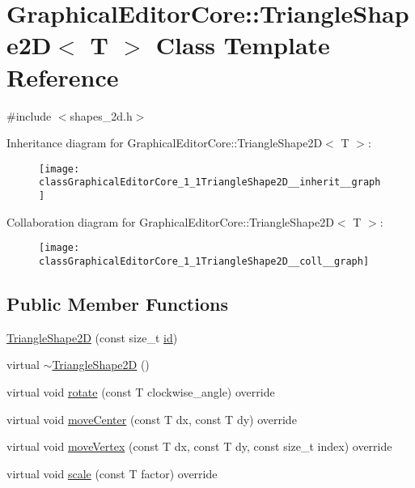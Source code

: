 \hypertarget{classGraphicalEditorCore_1_1TriangleShape2D}{}\section{Graphical\+Editor\+Core\+:\+:Triangle\+Shape2D$<$ T $>$ Class Template Reference}
\label{classGraphicalEditorCore_1_1TriangleShape2D}


{\ttfamily \#include $<$shapes\+\_\+2d.\+h$>$}



Inheritance diagram for Graphical\+Editor\+Core\+:\+:Triangle\+Shape2D$<$ T $>$\+:
\nopagebreak
\begin{figure}[H]
\begin{center}
\leavevmode
\texttt{[image: classGraphicalEditorCore\_1\_1TriangleShape2D\_\_inherit\_\_graph]}
\end{center}
\end{figure}


Collaboration diagram for Graphical\+Editor\+Core\+:\+:Triangle\+Shape2D$<$ T $>$\+:
\nopagebreak
\begin{figure}[H]
\begin{center}
\leavevmode
\texttt{[image: classGraphicalEditorCore\_1\_1TriangleShape2D\_\_coll\_\_graph]}
\end{center}
\end{figure}
\subsection*{Public Member Functions}
\begin{DoxyCompactItemize}
\item 
\hyperlink{classGraphicalEditorCore_1_1TriangleShape2D_af0339a667c63abd464603bf68e8d4770}{Triangle\+Shape2D} (const size\+\_\+t \hyperlink{classGraphicalEditorCore_1_1BaseShape2D_ac66cfa23289ae36d70ff6b7c41dd791f}{id})
\item 
virtual \hyperlink{classGraphicalEditorCore_1_1TriangleShape2D_a561fbaff5077e2d945eb8a9a95c48617}{$\sim$\+Triangle\+Shape2D} ()
\item 
virtual void \hyperlink{classGraphicalEditorCore_1_1TriangleShape2D_a70baf8d77cdaa6107cac5ba2c8f9bc5b}{rotate} (const T clockwise\+\_\+angle) override
\item 
virtual void \hyperlink{classGraphicalEditorCore_1_1TriangleShape2D_a2b84784e80b932ef32641e7ac7d41bee}{move\+Center} (const T dx, const T dy) override
\item 
virtual void \hyperlink{classGraphicalEditorCore_1_1TriangleShape2D_a904d1d62d033013b636062c38df68d29}{move\+Vertex} (const T dx, const T dy, const size\+\_\+t index) override
\item 
virtual void \hyperlink{classGraphicalEditorCore_1_1TriangleShape2D_a769d7053c7410e288abeaa8e6122ee26}{scale} (const T factor) override
\end{DoxyCompactItemize}


